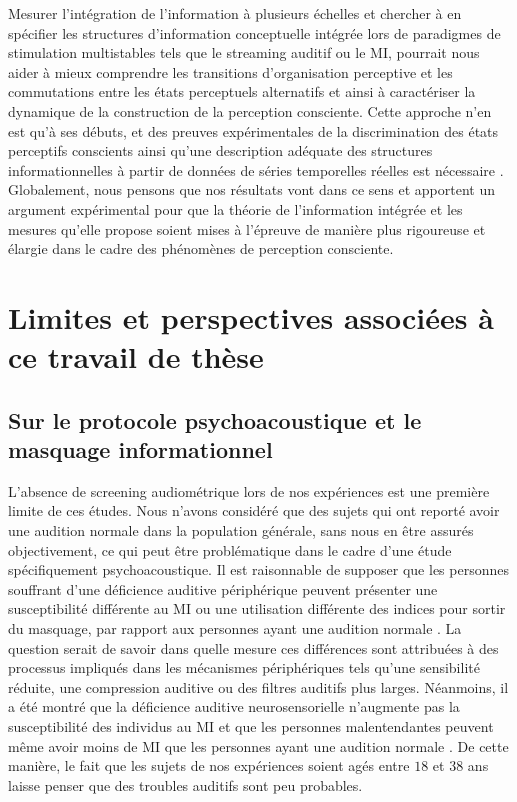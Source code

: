 Mesurer l'intégration de l'information à plusieurs échelles et chercher à en spécifier les structures d'information conceptuelle intégrée lors de paradigmes de stimulation multistables tels que le streaming auditif ou le MI, pourrait nous aider à mieux comprendre les transitions d'organisation perceptive et les commutations entre les états perceptuels alternatifs et ainsi à caractériser la dynamique de la construction de la perception consciente. 
Cette approche n'en est qu'à ses débuts, et des preuves expérimentales de la discrimination des états perceptifs conscients ainsi qu'une description adéquate des structures informationnelles à partir de données de séries temporelles réelles est nécessaire \citep{de2019fractal}.
Globalement, nous pensons que nos résultats vont dans ce sens et apportent un argument expérimental pour que la théorie de l'information intégrée et les mesures qu'elle propose soient mises à l'épreuve de manière plus rigoureuse et élargie dans le cadre des phénomènes de perception consciente. 

\section{Limites et perspectives associées à ce travail de thèse}

\subsection{Sur le protocole psychoacoustique et le masquage informationnel}

L'absence de screening audiométrique lors de nos expériences est une première limite de ces études. 
Nous n'avons considéré que des sujets qui ont reporté avoir une audition normale dans la population générale, sans nous en être assurés objectivement, ce qui peut être problématique dans le cadre d'une étude spécifiquement psychoacoustique. 
Il est raisonnable de supposer que les personnes souffrant d'une déficience auditive périphérique peuvent présenter une susceptibilité différente au MI ou une utilisation différente des indices pour sortir du masquage, par rapport aux personnes ayant une audition normale \citep{amiri2020overview}. 
La question serait de savoir dans quelle mesure ces différences sont attribuées à des processus impliqués dans les mécanismes périphériques tels qu'une sensibilité réduite, une compression auditive ou des filtres auditifs plus larges. 
Néanmoins, il a été montré que la déficience auditive neurosensorielle n'augmente pas la susceptibilité des individus au MI et que les personnes malentendantes peuvent même avoir moins de MI que les personnes ayant une audition normale \citep{alexander2004informational, micheyl2000informational}. 
De cette manière, le fait que les sujets de nos expériences soient agés entre $18$ et $38$ ans laisse penser que des troubles auditifs sont peu probables. 

